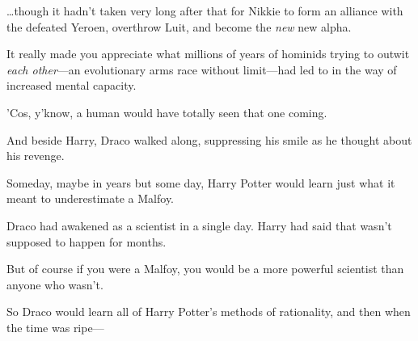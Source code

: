 {\ldots}though it hadn't taken very long after that for Nikkie to form an alliance with the defeated Yeroen, overthrow Luit, and become the \emph{new} new alpha.

It really made you appreciate what millions of years of hominids trying to outwit \emph{each other}—an evolutionary arms race without limit—had led to in the way of increased mental capacity.

'Cos, y'know, a human would have totally seen that one coming.

\later

And beside Harry, Draco walked along, suppressing his smile as he thought about his revenge.

Someday, maybe in years but some day, Harry Potter would learn just what it meant to underestimate a Malfoy.

Draco had awakened as a scientist in a single day. Harry had said that wasn't supposed to happen for months.

But of course if you were a Malfoy, you would be a more powerful scientist than anyone who wasn't.

So Draco would learn all of Harry Potter's methods of rationality, and then when the time was ripe—

